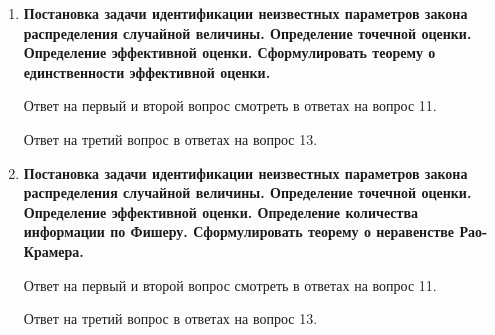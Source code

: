 \documentclass[12pt]{report}
\begin{document}
\begin{enumerate}
\begin{figure}[!h]
	\end{figure}
	\begin{figure}[!h]
	\end{figure}
	
	\item \textbf{Постановка задачи идентификации неизвестных параметров закона распределения случайной величины. Определение точечной оценки. Определение эффективной оценки. Сформулировать теорему о единственности эффективной оценки.}
	
	Ответ на первый и второй вопрос смотреть в ответах на вопрос 11.
	
	Ответ на третий вопрос в ответах на вопрос 13.
	
	\begin{figure}[!h]
	\end{figure}
	
	\item \textbf{Постановка задачи идентификации неизвестных параметров закона распределения случайной величины. Определение точечной оценки. Определение эффективной оценки. Определение
		количества информации по Фишеру. Сформулировать теорему о неравенстве Рао-Крамера.}
	
	Ответ на первый и второй вопрос смотреть в ответах на вопрос 11.
	
	Ответ на третий вопрос в ответах на вопрос 13.
	
	\clearpage
	

\end{enumerate}
\end{document}
